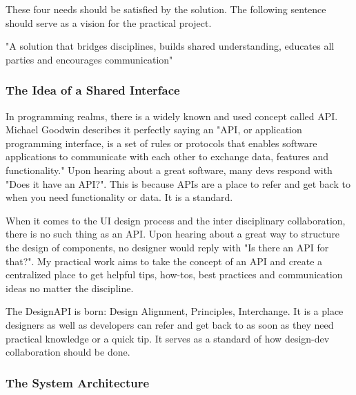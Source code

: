 These four needs should be satisfied by the solution. The following sentence should serve as a
vision for the practical project.

"A solution that bridges disciplines, builds shared understanding, educates all parties and
encourages communication"

\subsubsection{The Idea of a Shared Interface}


In programming realms, there is a widely known and used concept called API. Michael Goodwin
describes it perfectly saying an "API, or application programming interface, is a set of rules or
protocols that enables software applications to communicate with each other to exchange data,
features and functionality."  Upon hearing about a
great software, many devs respond with "Does it have an API?". This is because APIs are a place to
refer and get back to when you need functionality or data. It is a standard.

When it comes to the UI design process and the inter disciplinary collaboration, there is no such
thing as an API. Upon hearing about a great way to structure the design of components, no designer
would reply with "Is there an API for that?". My practical work aims to take the concept of an API
and create a centralized place to get helpful tips, how-tos, best practices and communication ideas
no matter the discipline.

The DesignAPI is born: Design Alignment, Principles, Interchange. It is a place designers as well as
developers can refer and get back to as soon as they need practical knowledge or a quick tip. It
serves as a standard of how design-dev collaboration should be done.

\subsubsection{The System Architecture}
% 

